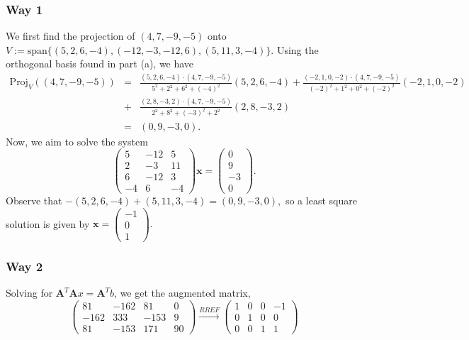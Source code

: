 \documentclass{article}
\newcommand{\matr}[1]{\mathbf{#1}}
\newcommand{\spn}{\text{span}}
\begin{document}
\begin{enumerate}[(a)]
    \subsubsection*{Way 1}
    We first find the projection of $(4,7,-9,-5)$ onto $V:=\spn\{(5,2,6,-4),(-12,-3,-12,6),(5,11,3,-4)\}.$ Using the orthogonal basis found in part (a), we have \begin{eqnarray*}
    \text{Proj}_V((4,7,-9,-5))&=&\frac{(5,2,6,-4)\cdot(4,7,-9,-5)}{5^2+2^2+6^2+(-4)^2}(5,2,6,-4)+\frac{(-2,1,0,-2)\cdot(4,7,-9,-5)}{(-2)^2+1^2+0^2+(-2)^2}(-2,1,0,-2)\\
    &+&\frac{(2,8,-3,2)\cdot(4,7,-9,-5)}{2^2+8^2+(-3)^2+2^2}(2,8,-3,2)\\
    &=&(0,9,-3,0).
    \end{eqnarray*}
    Now, we aim to solve the system $$\begin{pmatrix}5&-12&5\\2&-3&11\\6&-12&3\\-4&6&-4\end{pmatrix}\matr{x}=\begin{pmatrix}0\\9\\-3\\0\end{pmatrix}.$$
    Observe that $-(5,2,6,-4)+(5,11,3,-4)=(0,9,-3,0),$ so a least square solution is given by $\matr{x}=\begin{pmatrix}-1\\0\\1\end{pmatrix}.$
    \subsubsection*{Way 2}
    Solving for $\matr A^T \matr A x =\matr A^T b$, we get the augmented matrix,
    \begin{equation*}
        \left(\begin{array}{rrr|r}
        81 & -162 & 81 & 0 \\
        -162 & 333 & -153 & 9 \\
        81 & -153 & 171 & 90
        \end{array}\right) \xrightarrow[]{RREF}\left(\begin{array}{rrr|r}
1 & 0 & 0 & -1 \\
0 & 1 & 0 & 0 \\
0 & 0 & 1 & 1
\end{array}\right)
    \end{equation*}
\end{enumerate}
\end{document}
